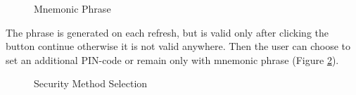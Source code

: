 \begin{figure}[H]
    \centering
    \caption{Mnemonic Phrase}
    \label{mnemonic-phrase}
\end{figure}

The phrase is generated on each refresh, but is valid only after clicking the button continue otherwise it is not valid anywhere. Then the user can choose to set an additional PIN-code or remain only with mnemonic phrase (Figure \ref{security-method}).

\begin{figure}[H]
    \centering
    \caption{Security Method Selection}
    \label{security-method}
\end{figure}

